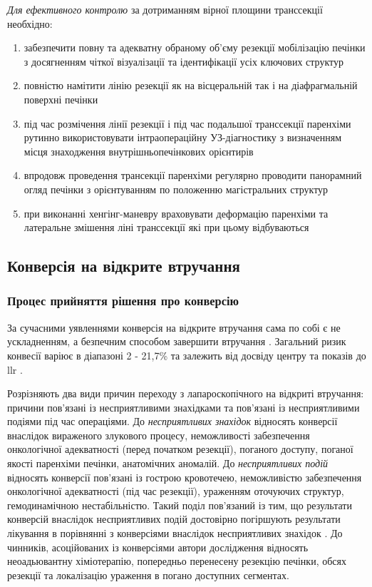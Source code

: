 \begin{refsection}
\textit{Для ефективного контролю} за дотриманням вірної площини транссекції необхідно:
\begin{enumerate}
    \item забезпечити повну та адекватну обраному об'єму резекції мобілізацію печінки з досягненням чіткої візуалізації та ідентифікації усіх ключових структур
    \item повністю намітити лінію резекції як на вісцеральній так і на діафрагмальній поверхні печінки
    \item під час розмічення лінії резекції і під час подальшої транссекції паренхіми рутинно використовувати інтраопераційну УЗ-діагностику з визначенням місця знаходження внутрішньопечінкових орієнтирів
    \item впродовж проведення трансекції паренхіми регулярно проводити панорамний огляд печінки з орієнтуванням по положенню магістральних структур
    \item при виконанні хенгінг-маневру враховувати деформацію паренхіми та латеральне змішення ліні транссекції які при цьому відбуваються
\end{enumerate}

\subsection{Конверсія на відкрите втручання}

\subsubsection{Процес прийняття рішення про конверсію}

За сучасними уявленнями конверсія на відкрите втручання сама по собі є не ускладненням, а безпечним способом завершити втручання \cite{AbuHilal2017a}. Загальний ризик конвесії варіює в діапазоні  2 - 21,7\% та залежить від досвіду центру та показів до \acrshort{llr} \cite{Ciria2016b}. 

Розрізняють два види причин переходу з лапароскопічного на відкриті втручання: причини пов'язані із несприятливими знахідками та пов'язані із несприятливими подіями під час операціями. До \textit{несприятливих знахідок} відносять конверсії внаслідок вираженого злукового процесу, неможливості забезпечення онкологічної адекватності (перед початком резекції), поганого доступу, поганої якості паренхіми печінки, анатомічних аномалій. До \textit{несприятливих подій} відносять конверсії пов'язані із гострою кровотечею, неможливістю забезпечення онкологічної адекватності (під час резекції), ураженням оточуючих структур, гемодинамічною нестабільністю. Такий поділ пов'язаний із тим, що результати конверсій внаслідок несприятливих подій достовірно погіршують результати лікування в порівнянні з конверсіями внаслідок несприятливих знахідок \cite{Halls2018}. До чинників, асоційованих із конверсіями автори дослідження відносять неоадьювантну хіміотерапію, попередньо перенесену резекцію печінки, обсях резекції та локалізацію ураження в погано доступних сегментах.


\end{refsection}

